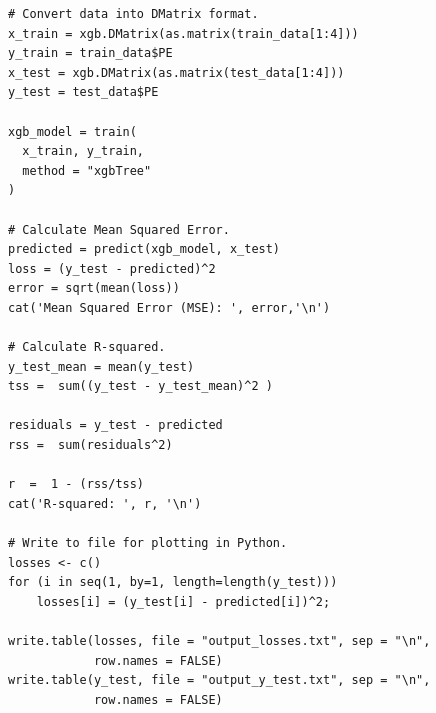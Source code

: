 \documentclass[letterpaper]{article} %
\begin{document}
{\begin{verbatim}
# Convert data into DMatrix format.
x_train = xgb.DMatrix(as.matrix(train_data[1:4]))
y_train = train_data$PE
x_test = xgb.DMatrix(as.matrix(test_data[1:4]))
y_test = test_data$PE

xgb_model = train(
  x_train, y_train,  
  method = "xgbTree"
)

# Calculate Mean Squared Error.
predicted = predict(xgb_model, x_test)
loss = (y_test - predicted)^2
error = sqrt(mean(loss))
cat('Mean Squared Error (MSE): ', error,'\n')

# Calculate R-squared.
y_test_mean = mean(y_test)
tss =  sum((y_test - y_test_mean)^2 )

residuals = y_test - predicted
rss =  sum(residuals^2)

r  =  1 - (rss/tss)
cat('R-squared: ', r, '\n')

# Write to file for plotting in Python.
losses <- c()
for (i in seq(1, by=1, length=length(y_test)))
	losses[i] = (y_test[i] - predicted[i])^2;

write.table(losses, file = "output_losses.txt", sep = "\n",
            row.names = FALSE)
write.table(y_test, file = "output_y_test.txt", sep = "\n",
            row.names = FALSE)
\end{verbatim}
}
\end{document}
